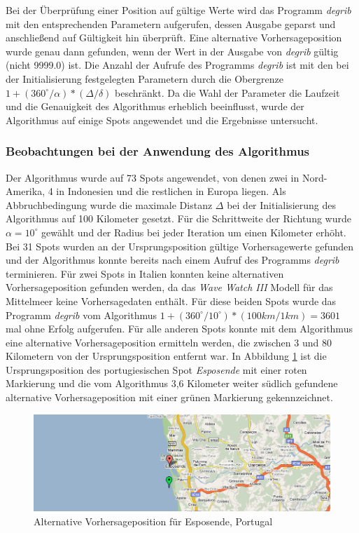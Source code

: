 Bei der Überprüfung einer Position auf gültige Werte wird das Programm
\textit{degrib} mit den entsprechenden Parametern aufgerufen, dessen
Ausgabe geparst und anschließend auf Gültigkeit hin überprüft. Eine
alternative Vorhersageposition wurde genau dann gefunden, wenn der
Wert in der Ausgabe von \textit{degrib} gültig (nicht 9999.0) ist. Die
Anzahl der Aufrufe des Programms \textit{degrib} ist mit den bei der
Initialisierung festgelegten Parametern durch die Obergrenze $1 +
(360^{\circ} / \alpha) * (\Delta / \delta)$ beschränkt. Da die Wahl
der Parameter die Laufzeit und die Genauigkeit des Algorithmus
erheblich beeinflusst, wurde der Algorithmus auf einige Spots
angewendet und die Ergebnisse untersucht.

\subsubsection{Beobachtungen bei der Anwendung des Algorithmus}
Der Algorithmus wurde auf 73 Spots angewendet, von denen zwei in
Nord-Amerika, 4 in Indonesien und die restlichen in Europa liegen. Als
Abbruchbedingung wurde die maximale Distanz $\Delta$ bei der
Initialisierung des Algorithmus auf 100 Kilometer gesetzt. Für die
Schrittweite der Richtung wurde $\alpha = 10^{\circ}$ gewählt und der
Radius bei jeder Iteration um einen Kilometer erhöht. Bei 31 Spots
wurden an der Ursprungsposition gültige Vorhersagewerte gefunden und
der Algorithmus konnte bereits nach einem Aufruf des Programms
\textit{degrib} terminieren. Für zwei Spots in Italien konnten keine
alternativen Vorhersageposition gefunden werden, da das \textit{Wave
  Watch III} Modell für das Mittelmeer keine Vorhersagedaten
enthält. Für diese beiden Spots wurde das Programm \textit{degrib} vom
Algorithmus $1 + (360^{\circ} / 10^{\circ}) * (100km / 1km) = 3601$
mal ohne Erfolg aufgerufen. Für alle anderen Spots konnte mit dem
Algorithmus eine alternative Vorhersageposition ermitteln werden, die
zwischen 3 und 80 Kilometern von der Ursprungsposition entfernt
war. In Abbildung \ref{locate-esposende} ist die Ursprungsposition des
portugiesischen Spot \textit{Esposende} mit einer roten Markierung und
die vom Algorithmus 3,6 Kilometer weiter südlich gefundene alternative
Vorhersageposition mit einer grünen Markierung gekennzeichnet.

\begin{figure}[h]
  \begin{center}
    \includegraphics[width=\textwidth]{bilder/locate-esposende}
    \caption{Alternative Vorhersageposition für Esposende, Portugal}
    \label{locate-esposende}
  \end{center}
\end{figure}

